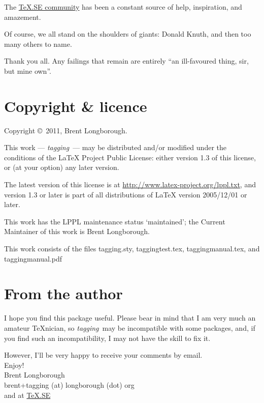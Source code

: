 \documentclass[a4paper,12pt,twoside,openany]{memoir}
\newcommand{\tpname}{\textsf{\itshape tagging}}
\begin{document}
The \href{http://tex.stackexchange.com}{\TeX.SE community}
has been a constant source of help, inspiration, and amazement.

Of course, we all stand on the shoulders of giants: Donald Knuth,
and then too many others to name.

Thank you all. Any failings that remain are entirely
``an ill-favoured thing, sir, but mine own''.

\section{Copyright \& licence}
Copyright \copyright\ 2011, Brent Longborough.

This work --- \tpname\ --- may be distributed and/or modified under the
conditions of the LaTeX Project Public License: either version 1.3
of this license, or (at your option) any later version.

The latest version of this license is at
\url{http://www.latex-project.org/lppl.txt},
and version 1.3 or later is part of all distributions of \LaTeX
version 2005/12/01 or later.

This work has the LPPL maintenance status `maintained';
the Current Maintainer of this work is Brent Longborough.

This work consists of the files tagging.sty, taggingtest.tex, 
taggingmanual.tex, and taggingmanual.pdf

\section{From the author}
I hope you find this package useful.
Please bear in mind that I am very much an amateur \TeX nician,
so \tpname\ may be incompatible with some packages, and,
if you find such an incompatibility, I may not have the skill to fix it.

However, I'll be very happy to receive your comments by email.\\[\baselineskip]
Enjoy!\\
Brent Longborough\\[\baselineskip]
\textsf{brent+tagging (at) longborough (dot) org}\\
and at \href{http://tex.stackexchange.com/users/344/brent-longborough}{\TeX.SE}
\end{document}
